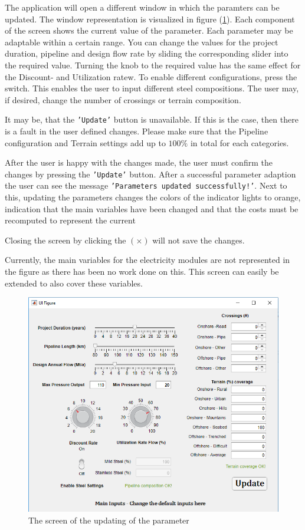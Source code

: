 \documentclass{article}
\begin{document}
The application will open a different window in which the paramters can be updated. The window representation is visualized in figure (\ref{fig:param1}). Each component of the screen shows the current value of the parameter. Each parameter may be adaptable within a certain range. You can change the values for the project duration, pipeline and design flow rate by sliding the corresponding slider into the required value. Turning the knob to the required value has the same effect for the Discount- and Utilization ratew. To enable different configurations, press the switch. This enables the user to input different steel compositions. The user may, if desired, change the number of crossings or terrain composition.
\begin{info}
	It may be, that the \texttt{'Update'} button is unavailable. If this is the case, then there is a fault in the user defined changes. Please make sure that the Pipeline configuration and Terrain settings add up to $100\%$ in total for each categories.
\end{info}
 After the user is happy with the changes made, the user must confirm the changes by pressing the \texttt{'Update'} button. After a successful parameter adaption the user can see the message \texttt{'Parameters updated successfully!'}. Next to this, updating the parameters changes the colors of the indicator lights to orange, indication that the main variables have been changed and that the costs must be recomputed to represent the current 
\begin{warn}
	Closing the screen by clicking the $(\times)$ will not save the changes.
\end{warn}
\begin{info}
	Currently, the main variables for the electricity modules are not represented in the figure as there has been no work done on this. This screen can easily be extended to also cover these variables.
\end{info}

\begin{figure}[ht!]
  \centering
  \includegraphics[width=.75\linewidth]{param1.png}
  \caption{The screen of the updating of the parameter}
  \label{fig:param1}
\end{figure}
\end{document}

